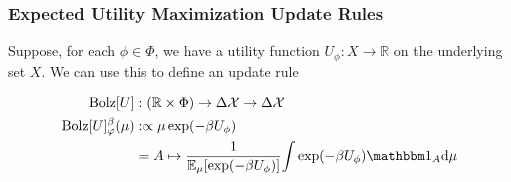 \subsubsection{Expected Utility Maximization Update Rules}


%
%

\def\Bolz#1{\mathrm{Bolz}[#1]}


Suppose, for each $\phi \in \Phi$, we have a utility function $U_\phi : X \to \mathbb R$ on the underlying set $X$.
We can use this to define an update rule

\begin{align*}
	\Bolz U &: (\mathbb R \times \Phi) \to \Delta\X \to \Delta\X \\
	\Bolz U^\beta_\varphi(\mu)
		&:\propto
			\mu \exp(-\beta U_\phi) \\
		&= A \mapsto \frac
			1{\Ex_{\mu} [ \exp(-\beta U_\phi)]}
			{\int \exp(-\beta U_\phi) \mathbbm 1_A \mathrm d\mu }
\end{align*}

